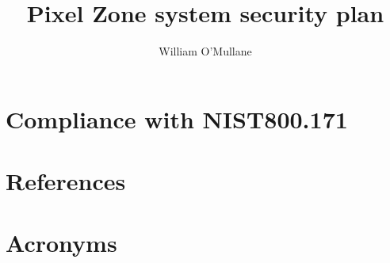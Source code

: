 \documentclass[OPS,lsstdraft,authoryear,toc]{lsstdoc}
\title{Pixel Zone  system security plan}
\author{%
William O'Mullane
}
\date{\vcsDate}
\begin{document}
\maketitle



\appendix
\section{Compliance with NIST800.171} \label{sec:compliance}


\section{References} \label{sec:bib}
\renewcommand{\refname}{} %


\section{Acronyms} \label{sec:acronyms}

\end{document}
